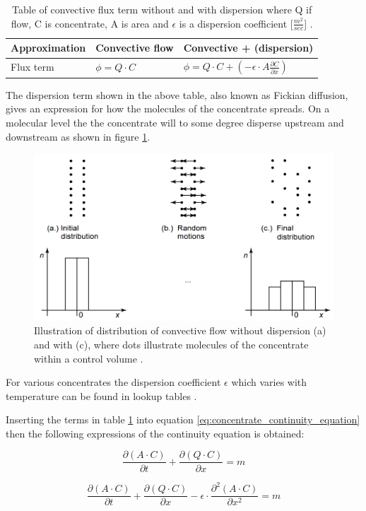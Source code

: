 \begin{table}[H]
\centering
	\begin{tabular}{|l|l|l|} \hline
	Approximation 	& Convective flow &	Convective + (dispersion)  \\ \hline
	Flux term   	& $\phi = Q \cdot C$ & $ \phi = Q \cdot C + \left(- \epsilon \cdot A \frac{\partial C}{\partial x} \right)$  \\ \hline
  	\end{tabular} 
\caption{Table of convective flux term without and with dispersion where Q if flow, C is concentrate, A is area and $\epsilon$ is a dispersion coefficient [$\frac{m^2}{sec}$] .}
\label{tab:flux_terms} 
\end{table}

The dispersion term shown in the above table, also known as Fickian diffusion, gives an expression for how the molecules of the concentrate spreads. On a molecular level the the concentrate will to some degree disperse upstream and downstream as shown in figure \ref{fig:diffusion_example}. 

\begin{figure}[H]
\centering
\includegraphics[width=.75\textwidth]{report/modeling/pictures/diffusion_example.png}
\caption{Illustration of distribution of convective flow without dispersion (a) and with (c), where dots illustrate molecules of the concentrate within a control volume \cite{karlruhe_con_def_dif_equation}.}
\label{fig:diffusion_example}
\end{figure} 

For various concentrates the dispersion coefficient $\epsilon$ which varies with temperature can be found in lookup tables \cite{karlruhe_con_def_dif_equation}.

Inserting the terms in table \ref{tab:flux_terms} into equation \ref{eq:concentrate_continuity_equation} then the following expressions of the continuity equation is obtained:

\begin{equation}
	\frac{\partial (A\cdot C)}{\partial t} + \frac{\partial (Q \cdot C)}{\partial x} = m 
\label{eq:concentrate_continuity_equation_convective}
\end{equation}

\begin{equation}
	\frac{\partial (A\cdot C)}{\partial t} + \frac{\partial (Q \cdot C)}{\partial x} - \epsilon \cdot \frac{\partial^2 (A \cdot C)}{\partial x^2} = m 
\label{eq:concentrate_continuity_equation_dispersion}
\end{equation}

